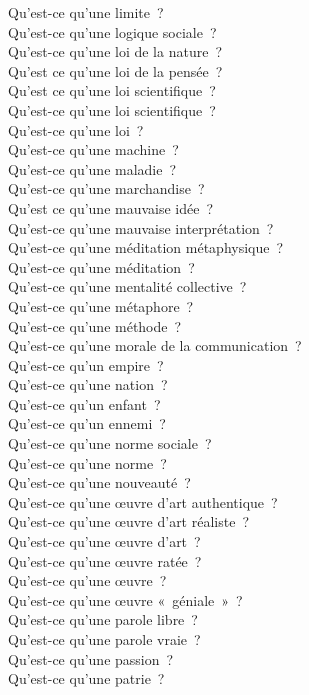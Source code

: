 \documentclass[a4paper,12pt]{article}
\begin{document}
Qu'est-ce qu'une limite ? \\
Qu'est-ce qu'une logique sociale ? \\
Qu'est-ce qu'une loi de la nature ? \\
Qu'est ce qu'une loi de la pensée ? \\
Qu'est ce qu'une loi scientifique ? \\
Qu'est-ce qu'une loi scientifique ? \\
Qu'est-ce qu'une loi ? \\
Qu'est-ce qu'une machine ? \\
Qu'est-ce qu'une maladie ? \\
Qu'est-ce qu'une marchandise ? \\
Qu'est ce qu'une mauvaise idée ? \\
Qu'est-ce qu'une mauvaise interprétation ? \\
Qu'est-ce qu'une méditation métaphysique ? \\
Qu'est-ce qu'une méditation ? \\
Qu'est-ce qu'une mentalité collective ? \\
Qu'est-ce qu'une métaphore ? \\
Qu'est-ce qu'une méthode ? \\
Qu'est-ce qu'une morale de la communication ? \\
Qu'est-ce qu'un empire ? \\
Qu'est-ce qu'une nation ? \\
Qu'est-ce qu'un enfant ? \\
Qu'est-ce qu'un ennemi ? \\
Qu'est-ce qu'une norme sociale ? \\
Qu'est-ce qu'une norme ? \\
Qu'est-ce qu'une nouveauté ? \\
Qu'est-ce qu'une œuvre d'art authentique ? \\
Qu'est-ce qu'une œuvre d'art réaliste ? \\
Qu'est-ce qu'une œuvre d'art ? \\
Qu'est-ce qu'une œuvre ratée ? \\
Qu'est-ce qu'une œuvre ? \\
Qu'est-ce qu'une œuvre « géniale » ? \\
Qu'est-ce qu'une parole libre ? \\
Qu'est-ce qu'une parole vraie ? \\
Qu'est-ce qu'une passion ? \\
Qu'est-ce qu'une patrie ? \\
\end{document}
